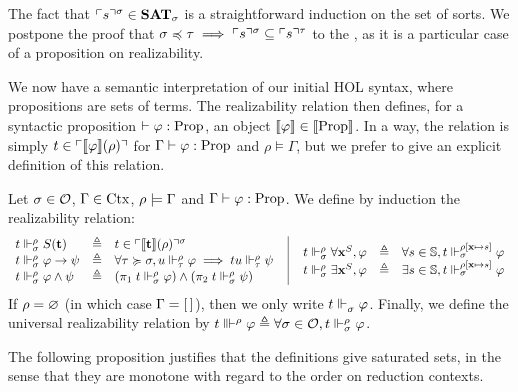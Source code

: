 \documentclass[a4paper,UKenglish,cleveref, autoref, thm-restate]{lipics-v2021}
\newcommand{\todo}[1]{\textcolor{red}{TODO: #1}}
\begin{document}
The fact that $\ulcorner s\urcorner^{\sigma} \in{\mathbf{SAT}}_{\sigma}$ is a straightforward induction on the set of sorts. We postpone the proof that $\sigma\preccurlyeq \tau \implies \ulcorner s\urcorner^{\sigma} \subseteq \ulcorner s\urcorner^{\tau}$ to the  , as it is a particular case of a proposition on realizability.

We now have a semantic interpretation of our initial HOL syntax, where propositions are sets of terms. The realizability relation then defines, for a syntactic proposition $\vdash \varphi : \mathrm{Prop}$, an object $\llbracket \varphi \rrbracket \in \llbracket \mathrm{Prop} \rrbracket$. In a way, the relation is simply $t \in \ulcorner\llbracket \varphi \rrbracket(\rho)\urcorner$ for $\Gamma\vdash \varphi : \mathrm{Prop}$ and $\rho\models \Gamma$, but we prefer to give an explicit definition of this relation.

\begin{definition}\label{def:real}
Let $\sigma \in \mathcal O$, $\Gamma \in \mathrm{Ctx}$, $\rho \models \Gamma$ and $\Gamma\vdash \varphi : \mathrm{Prop}$. We define by induction the realizability relation:
\[\begin{array}{lcl}
   t \realPP \sortPred{\termt} &\defeq& t \in \codE{\sem{\termt}(\termenv)}
      \\
      t \realPP \varphi \to \psi &\defeq& \forall \enviroT \supOr\enviro, u \realP{\enviroT}{\termenv} \varphi \implies tu \realP{\enviroT}{\termenv}\psi
      \\
      t \realPP \varphi \land \psi &\defeq& (\pi_1\;t \realPP \varphi) \land (\pi_2\;t \realPP \psi)
     \end{array}
     ~~
     \vrule~~
     \begin{array}{lcl}
      t \realPP \forall \varx^S, \varphi &\defeq& \forall s \in \bS, t\realP{\enviro}{\termenv[\varx \mapsto s]} \varphi
      \\
      t \realPP \exists \varx^S, \varphi& \defeq& \exists s \in \bS, t \realP{\enviro}{\termenv[\varx \mapsto s]} \varphi
     \end{array}
  \]
If $\rho = \varnothing$ (in which case $\Gamma = [\,]$), then we only write $t \Vdash_{\sigma}^{} \varphi$.
Finally, we define the universal realizability relation by
  $t \Vvdash^{\rho} \varphi \triangleq \forall \sigma \in \mathcal O, t \Vdash_{\sigma}^{\rho}\varphi$.
\end{definition}

The following proposition justifies that the definitions give saturated sets, in the sense that they are monotone with regard to the order on reduction contexts.
\end{document}
